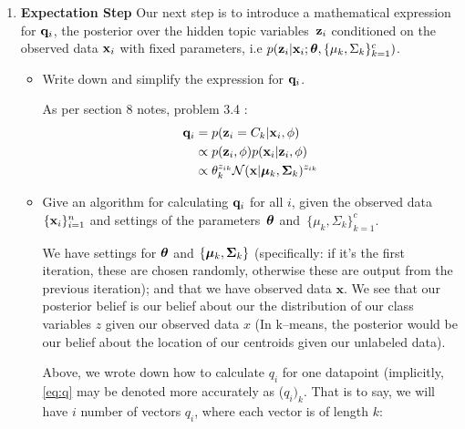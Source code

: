 \documentclass[submit]{harvardml}
\newenvironment{answer}{%
\color{answergreen}\sffamily\large}{}
\newcommand{\bx}{\mathbf{x}} %
\newcommand{\bz}{\mathbf{z}} %
\newcommand{\bq}{\mathbf{q}} %
\begin{document}
\begin{enumerate}
\begin{answer}
		\end{answer}

    \item \textbf{Expectation Step}
        Our next step is to introduce a mathematical expression for $\mathbf{q}_i$, the posterior over
        the hidden topic variables~$\mathbf{z}_i$ conditioned on the observed data $\mathbf{x}_i$ with fixed
        parameters, i.e $p(\mathbf{z}_i | \mathbf{x}_i; \boldsymbol{\theta}, \{ \mu_k,\Sigma_k \}^c_{k=1})$.

        \begin{itemize}
            \item  Write down and simplify the expression for $\mathbf{q}_i$. 

				\begin{answer}
                    As per section 8 notes, problem 3.4 :
                    \begin{align}
                        \bq_i &= p(\bz_i = C_k | \bx_i, \phi)  \\ \label{eq:q}
                              &\propto p(\bz_i, \phi) p(\bx_i | \bz_i, \phi) \\ 
                              &\propto \theta_k^{z_{ik}}\mathcal{N}(\bx|\bmu_k,\bSigma_k)^{z_{ik}} 
                    \end{align}



				\end{answer}

            \item  Give an algorithm for calculating $\mathbf{q}_i$ for all $i$, given the observed
                data~$\{\mathbf{x}_i\}^n_{i=1}$ and settings of the parameters~$\boldsymbol{\theta}$ and~$\{
                \mu_k,\Sigma_k  \}^c_{k=1}$.

				\begin{answer}
                    We have settings for $\boldsymbol{\theta}$ and $\{\boldsymbol{\mu}_k,\mathbf{\Sigma}_k\}$
                    (specifically: if it's
                    the first iteration, these are chosen randomly, otherwise these are output from
                    the previous iteration); and that we have observed data $\bx$. We see that our
                    posterior belief is our belief about our  the distribution of our class
                    variables $z$ given our observed data $x$ (In k--means, the posterior would be
                    our belief about the location of our centroids given our unlabeled data).
                    
                    Above, we wrote down how to calculate $q_i$ for one datapoint (implicitly,
                    \ref{eq:q} may be denoted more accurately as ($q_i)_k$. That is to say, we will
                    have $i$ number of vectors $q_i$, where each vector is of length $k$:
                    

\end{answer}
\end{itemize}
\end{enumerate}
\end{document}

